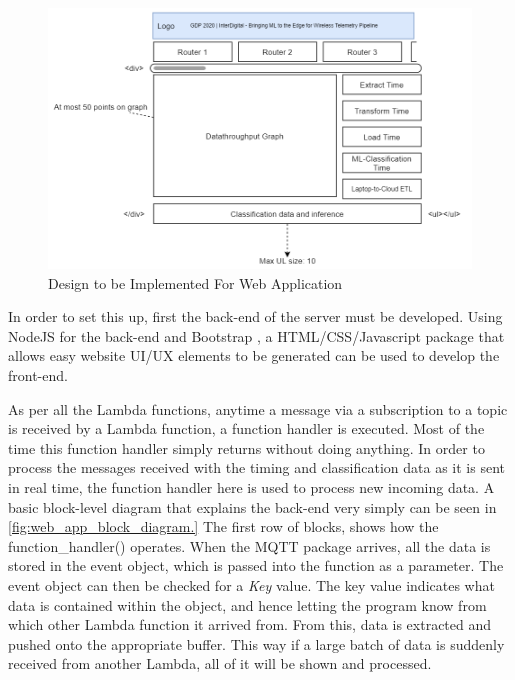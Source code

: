 \begin{figure}[ht]
    \centering
    \includegraphics[width=1\linewidth]{pages/Chapter4/Chapter 4 Images/web_app_design.png}
    \caption{Design to be Implemented For Web Application}
    \label{fig:web_app_design}
\end{figure}

In order to set this up, first the back-end of the server must be developed. Using NodeJS for the back-end and Bootstrap \cite{mark_otto_2021}, a HTML/CSS/Javascript package that allows easy website UI/UX elements to be generated can be used to develop the front-end. 

As per all the Lambda functions, anytime a message via a subscription to a topic is received by a Lambda function, a function handler is executed. Most of the time this function handler simply returns without doing anything. In order to process the messages received with the timing and classification data as it is sent in real time, the function handler here is used to process new incoming data. A basic block-level diagram that explains the back-end very simply can be seen in \ref{fig:web_app_block_diagram.} 
The first row of blocks, shows how the function\_handler() operates. When the MQTT package arrives, all the data is stored in the event object, which is passed into the function as a parameter. The event object can then be checked for a \textit{Key} value. The key value indicates what data is contained within the object, and hence letting the program know from which other Lambda function it arrived from. From this, data is extracted and pushed onto the appropriate buffer. This way if a large batch of data is suddenly received from another Lambda, all of it will be shown and processed.

